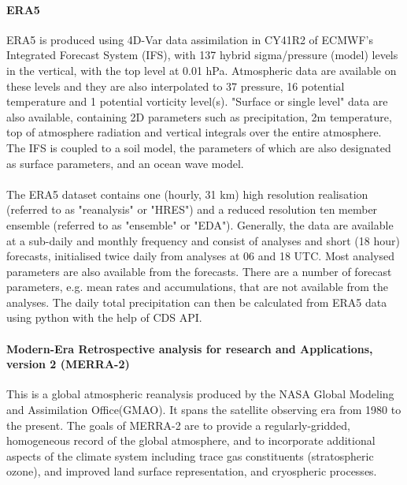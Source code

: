 \paragraph{ERA5}
ERA5 is produced using 4D-Var data assimilation in CY41R2 of ECMWF's Integrated Forecast System (IFS), with 137 hybrid sigma/pressure (model) levels in the vertical, with the top level at 0.01 hPa. Atmospheric data are available on these levels and they are also interpolated to 37 pressure, 16 potential temperature and 1 potential vorticity level(s). \cite{hersbach2020era5}"Surface or single level" data are also available, containing 2D parameters such as precipitation, 2m temperature, top of atmosphere radiation and vertical integrals over the entire atmosphere. The IFS is coupled to a soil model, the parameters of which are also designated as surface parameters, and an ocean wave model.\\\\
The ERA5 dataset contains one (hourly, 31 km) high resolution realisation (referred to as "reanalysis" or "HRES") and a reduced resolution ten member ensemble (referred to as "ensemble" or "EDA"). Generally, the data are available at a sub-daily and monthly frequency and consist of analyses and short (18 hour) forecasts, initialised twice daily from analyses at 06 and 18 UTC.\cite{hersbach2020era5} Most analysed parameters are also available from the forecasts. There are a number of forecast parameters, e.g. mean rates and accumulations, that are not available from the analyses.
The daily total precipitation can then be calculated from ERA5 data using python with the help of CDS API.
\paragraph{Modern-Era Retrospective analysis for research and Applications, version 2 (MERRA-2)}
This is a global atmospheric reanalysis produced by the NASA Global Modeling and Assimilation Office(GMAO). It spans the satellite observing era from 1980 to the present. The goals of MERRA-2 are to provide a regularly-gridded, homogeneous record of the global atmosphere, and to incorporate additional aspects of the climate system including trace gas constituents (stratospheric ozone), and improved land surface representation, and cryospheric processes.
